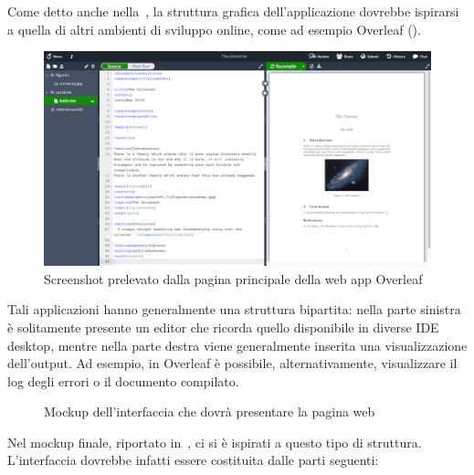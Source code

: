       Come detto anche nella~, la struttura grafica dell'applicazione dovrebbe ispirarsi a quella di altri ambienti di sviluppo online,
      come ad esempio Overleaf ().

      \begin{figure}[htbp]
        \centering
        \includegraphics[width=.85\textwidth]{res/fig/overleaf.png}%
        \caption{Screenshot prelevato dalla pagina principale della web app Overleaf}%
        \label{fig:overleaf}
      \end{figure}

      Tali applicazioni hanno generalmente una struttura bipartita:
      nella parte sinistra è solitamente presente un editor che ricorda quello disponibile in diverse IDE desktop, mentre nella parte destra viene generalmente inserita una visualizzazione dell'output.
      Ad esempio, in Overleaf è possibile, alternativamente, visualizzare il log degli errori o il documento compilato.

      \begin{figure}[htbp]
        \centering
        \caption{Mockup dell'interfaccia che dovrà presentare la pagina web}%
        \label{fig:mockup}
      \end{figure}

      Nel mockup finale, riportato in~, ci si è ispirati a questo tipo di struttura.
      L'interfaccia dovrebbe infatti essere costituita dalle parti seguenti:

